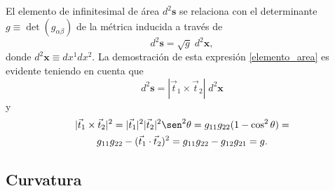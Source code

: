 El elemento de infinitesimal de área $d^2\mathbf{s}$ se relaciona con el
determinante $g\equiv\det(g_{\alpha\beta})$ de la métrica inducida a través de
\begin{equation}\label{elemento_area}
d^2\mathbf{s}=\sqrt{g}\;d^2\mathbf{x},
\end{equation}
donde $d^2\mathbf{x}\equiv dx^1dx^2$. La demostración de esta expresión
\eqref{elemento_area} es evidente teniendo en cuenta que
\begin{equation*}
d^2\mathbf{s}=|\vec{t}_1\times\vec{t}_2|\;d^2\mathbf{x}
\end{equation*}
y
\begin{multline*}
|\vec{t}_1\times\vec{t}_2|^2=|\vec{t}_1|^2|\vec{t}_2|^2\sen^2
\theta=g_{11}g_{22}(1-\cos^2 \theta)=\\
g_{11}g_{22}-(\vec{t}_1\cdot\vec{t}_2)^2=g_{11}g_{22}-g_{12}g_{21}=g.
\end{multline*}

\subsection{Curvatura}

